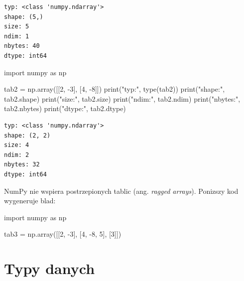 \documentclass[
  polish,
  letterpaper,
  DIV=11,
  numbers=noendperiod]{scrreprt}
\newenvironment{Shaded}{\begin{snugshade}}{\end{snugshade}}
\newcommand{\BuiltInTok}[1]{\textcolor[rgb]{0.00,0.23,0.31}{#1}}
\newcommand{\DecValTok}[1]{\textcolor[rgb]{0.68,0.00,0.00}{#1}}
\newcommand{\ImportTok}[1]{\textcolor[rgb]{0.00,0.46,0.62}{#1}}
\newcommand{\NormalTok}[1]{\textcolor[rgb]{0.00,0.23,0.31}{#1}}
\newcommand{\OperatorTok}[1]{\textcolor[rgb]{0.37,0.37,0.37}{#1}}
\newcommand{\StringTok}[1]{\textcolor[rgb]{0.13,0.47,0.30}{#1}}
\begin{document}
\begin{verbatim}
typ: <class 'numpy.ndarray'>
shape: (5,)
size: 5
ndim: 1
nbytes: 40
dtype: int64
\end{verbatim}

\begin{Shaded}
\begin{Highlighting}[]
\ImportTok{import}\NormalTok{ numpy }\ImportTok{as}\NormalTok{ np}

\NormalTok{tab2 }\OperatorTok{=}\NormalTok{ np.array([[}\DecValTok{2}\NormalTok{, }\OperatorTok{{-}}\DecValTok{3}\NormalTok{], [}\DecValTok{4}\NormalTok{, }\OperatorTok{{-}}\DecValTok{8}\NormalTok{]])}
\BuiltInTok{print}\NormalTok{(}\StringTok{"typ:"}\NormalTok{, }\BuiltInTok{type}\NormalTok{(tab2))}
\BuiltInTok{print}\NormalTok{(}\StringTok{"shape:"}\NormalTok{, tab2.shape)}
\BuiltInTok{print}\NormalTok{(}\StringTok{"size:"}\NormalTok{, tab2.size)}
\BuiltInTok{print}\NormalTok{(}\StringTok{"ndim:"}\NormalTok{, tab2.ndim)}
\BuiltInTok{print}\NormalTok{(}\StringTok{"nbytes:"}\NormalTok{, tab2.nbytes)}
\BuiltInTok{print}\NormalTok{(}\StringTok{"dtype:"}\NormalTok{, tab2.dtype)}
\end{Highlighting}
\end{Shaded}

\begin{verbatim}
typ: <class 'numpy.ndarray'>
shape: (2, 2)
size: 4
ndim: 2
nbytes: 32
dtype: int64
\end{verbatim}

NumPy nie wspiera postrzepionych tablic (ang. \emph{ragged arrays}).
Ponizszy kod wygeneruje blad:

\begin{Shaded}
\begin{Highlighting}[]
\ImportTok{import}\NormalTok{ numpy }\ImportTok{as}\NormalTok{ np}

\NormalTok{tab3 }\OperatorTok{=}\NormalTok{ np.array([[}\DecValTok{2}\NormalTok{, }\OperatorTok{{-}}\DecValTok{3}\NormalTok{], [}\DecValTok{4}\NormalTok{, }\OperatorTok{{-}}\DecValTok{8}\NormalTok{, }\DecValTok{5}\NormalTok{], [}\DecValTok{3}\NormalTok{]])}
\end{Highlighting}
\end{Shaded}

\chapter{Typy danych}\label{typy-danych}
\end{document}
